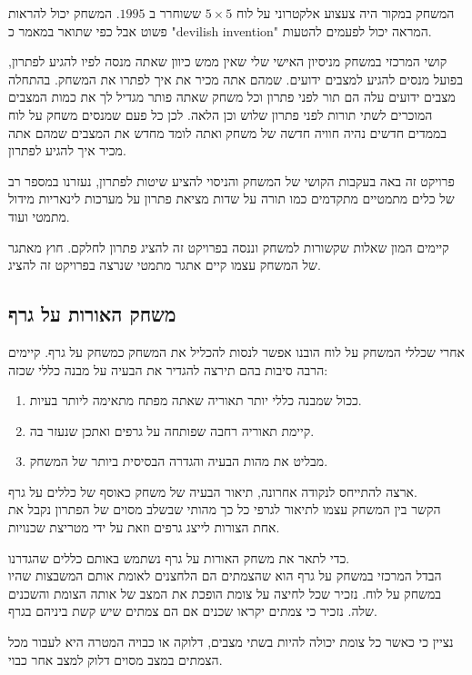 \documentclass[12pt,twoside]{article}
\begin{document}
המשחק במקור היה צעצוע אלקטרוני על לוח 
$5 \times 5$
ששוחרר ב 
$1995$.
המשחק יכול להראות פשוט אבל כפי שתואר
במאמר
\cite{B1}
כ
\textenglish{"devilish invention"}
המראה יכול לפעמים להטעות.

קושי המרכזי במשחק מניסיון האישי שלי שאין ממש כיוון שאתה מנסה לפיו להגיע לפתרון, בפועל מנסים להגיע למצבים ידועים.
שמהם אתה מכיר את איך לפתרו את המשחק. בהתחלה מצבים ידועים עלה הם תור לפני פתרון וכל 
משחק שאתה פותר מגדיל לך את כמות המצבים המוכרים לשתי תורות לפני פתרון שלוש וכן הלאה.
לכן כל פעם שמנסים משחק על לוח בממדים חדשים נהיה חוויה חדשה של משחק 
ואתה 
לומד מחדש את המצבים שמהם אתה מכיר איך להגיע לפתרון.

פרויקט זה באה בעקבות הקושי של המשחק
והניסוי להציע שיטות לפתרון, 
נעזרנו במספר רב של כלים מתמטיים מתקדמים
כמו תורה על שדות מציאת פתרון על מערכות לינאריות מידול מתמטי ועוד.

קיימים המון שאלות שקשורות למשחק וננסה בפרויקט זה להציג פתרון לחלקם.
חוץ מאתגר של המשחק עצמו קיים אתגר מתמטי שנרצה בפרויקט זה להציג.

\subsection{ משחק האורות על גרף}
אחרי שכללי המשחק על לוח הובנו אפשר לנסות להכליל את המשחק כמשחק על גרף.
קיימים הרבה סיבות בהם תירצה להגדיר את הבעיה על מבנה כללי שכזה:

\begin{enumerate}
    \item 
    ככול שמבנה כללי יותר תאוריה שאתה מפתח מתאימה ליותר בעיות.
    \item 
    קיימת תאוריה רחבה שפותחה על גרפים ואתכן שנעזר בה.
    \item 
    מבליט את מהות הבעיה והגדרה הבסיסית ביותר של המשחק.
\end{enumerate}

ארצה להתייחס לנקודה אחרונה, תיאור הבעיה של משחק
כאוסף של כללים על גרף.
\\
הקשר בין המשחק עצמו לתיאור לגרפי כל כך מהותי
שבשלב מסוים של הפתרון נקבל את אחת הצורות לייצג גרפים וזאת על ידי מטריצת שכנויות.

כדי לתאר את משחק האורות על גרף נשתמש באותם כללים שהגדרנו.
\\
הבדל המרכזי במשחק על גרף הוא
שהצמתים הם הלחצנים לאומת אותם המשבצות שהיו במשחק על לוח.
נזכיר שכל לחיצה על צומת הופכת את המצב של אותה הצומת והשכנים שלה.
נזכיר כי צמתים יקראו שכנים אם הם צמתים שיש
קשת ביניהם בגרף.

נציין כי כאשר כל צומת יכולה להיות בשתי מצבים,
דלוקה או כבויה המטרה היא לעבור מכל הצמתים במצב מסוים דלוק למצב אחר כבוי.
\end{document}
